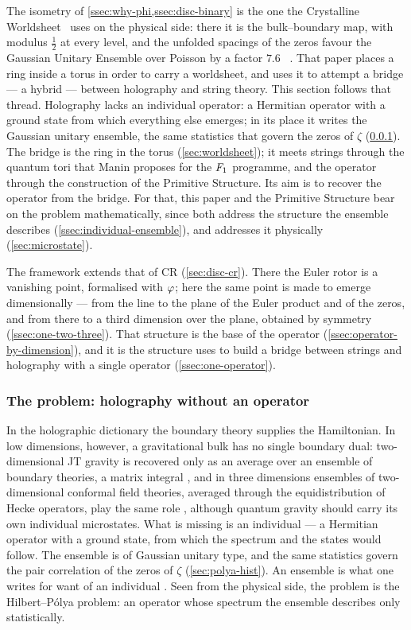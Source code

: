 The isometry of \cref{ssec:why-phi,ssec:disc-binary} is the one the Crystalline
Worldsheet~\cite{gonzalez26cw} uses on the physical side: there it is the bulk--boundary map, with modulus
$\tfrac12$ at every level, and the unfolded spacings of the zeros favour the Gaussian Unitary Ensemble
over Poisson by a factor $7.6$ ~\cite[\S2.13]{gonzalez26cw}.  That paper places a ring inside a torus in order to carry a
worldsheet, and uses it to attempt a bridge --- a hybrid --- between holography and string theory.  This section follows that thread.  Holography lacks an individual
operator: a Hermitian operator with a ground state from which everything else emerges;
in its place it writes the Gaussian unitary ensemble, the same statistics that govern
the zeros of $\zeta$ (\cref{ssec:holography-problem}).  The bridge is the ring in the
torus (\cref{sec:worldsheet}); it meets strings through the quantum tori that Manin
proposes for the $F_1$ programme, and the operator through the construction of the Primitive Structure.  Its aim is to recover the operator from the bridge.  For that, this
paper and the Primitive Structure bear on the problem mathematically, since both
address the structure the ensemble describes (\cref{ssec:individual-ensemble}), and
\cite{gonzalez26cw} addresses it physically (\cref{sec:microstate}).

The framework extends that of CR (\cref{sec:disc-cr}).  There the Euler rotor is a
vanishing point, formalised with $\varphi$; here the same point is made to emerge
dimensionally --- from the line to the plane of the Euler product and of the zeros, and
from there to a third dimension over the plane, obtained by symmetry
(\cref{ssec:one-two-three}).  That structure is the base of the operator
(\cref{ssec:operator-by-dimension}), and it is the structure \cite{gonzalez26cw} uses to
build a bridge between strings and holography with a single operator
(\cref{ssec:one-operator}).

\subsubsection{The problem: holography without an operator}\label{ssec:holography-problem}

In the holographic dictionary the boundary theory supplies the Hamiltonian.  In low
dimensions, however, a gravitational bulk has no single boundary dual: two-dimensional JT gravity is recovered only as an average over an ensemble of boundary theories, a matrix integral \cite{saad19}, and in three dimensions ensembles of two-dimensional conformal field theories, averaged through the equidistribution of Hecke operators, play the same role \cite{cooper26}, although quantum gravity should carry its own
individual microstates.  What is missing is an individual --- a Hermitian operator with
a ground state, from which the spectrum and the states would follow.  The ensemble is
of Gaussian unitary type, and the same statistics govern the pair correlation of the
zeros of $\zeta$ (\cref{sec:polya-hist}).  An ensemble is what one writes for want of an
individual \cite[\S2.13]{gonzalez26cw}.  Seen from the physical side, the problem is the
Hilbert--P\'olya problem: an operator whose spectrum the ensemble describes only
statistically.

